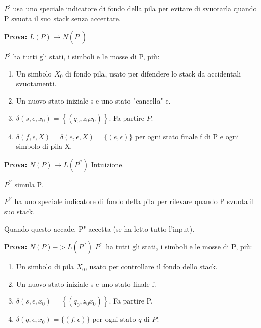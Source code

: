 $P^{\prime}$ usa uno speciale indicatore di fondo della pila per evitare di svuotarla quando P svuota il suo stack senza accettare.

\vspace{5mm}

\textbf{Prova:} $L(P) \rightarrow N\left(P^{\prime}\right)$

$P^{\prime}$ ha tutti gli stati, i simboli e le mosse di P, più:
\begin{enumerate}
    \item Un simbolo $X_{0}$ di fondo pila, usato per difendere lo stack da accidentali svuotamenti.
    \item Un nuovo stato iniziale s e uno stato "cancella" e.
    \item $\delta\left(s, \epsilon, x_{0}\right)=\left\{\left(q_{0}, z_{0} x_{0}\right)\right\}$. Fa partire $P$.
    \item $\delta(f, \epsilon, X)=\delta(e, \epsilon, X)=\{(e, \epsilon)\}$ per ogni stato finale $\mathrm{f}$ di $\mathrm{P}$ e ogni simbolo di pila $\mathrm{X}$.

\end{enumerate}

\vspace{5mm}

\textbf{Prova:} $N(P) \rightarrow L\left(P^{\prime \prime}\right)$ Intuizione.

$P^{\prime \prime}$ simula P.

$P^{\prime \prime}$ ha uno speciale indicatore di fondo della pila per rilevare quando P svuota il suo stack.

Quando questo accade, P" accetta (se ha letto tutto l'input).

\vspace{5mm}

\textbf{Prova:} $N(P)->L\left(P^{\prime \prime}\right)$
$P^{\prime \prime}$ ha tutti gli stati, i simboli e le mosse di P, più:
\begin{enumerate}
    \item Un simbolo di pila $X_{0}$, usato per controllare il fondo dello stack.
    \item  Un nuovo stato iniziale s e uno stato finale $\mathrm{f}$.
    \item $\delta\left(s, \epsilon, x_{0}\right)=\left\{\left(q_{0}, z_{0} x_{0}\right)\right\}$. Fa partire P.
    \item $\delta\left(q, \epsilon, x_{0}\right)=\{(f, \epsilon)\}$ per ogni stato $q$ di $P$.
\end{enumerate}

